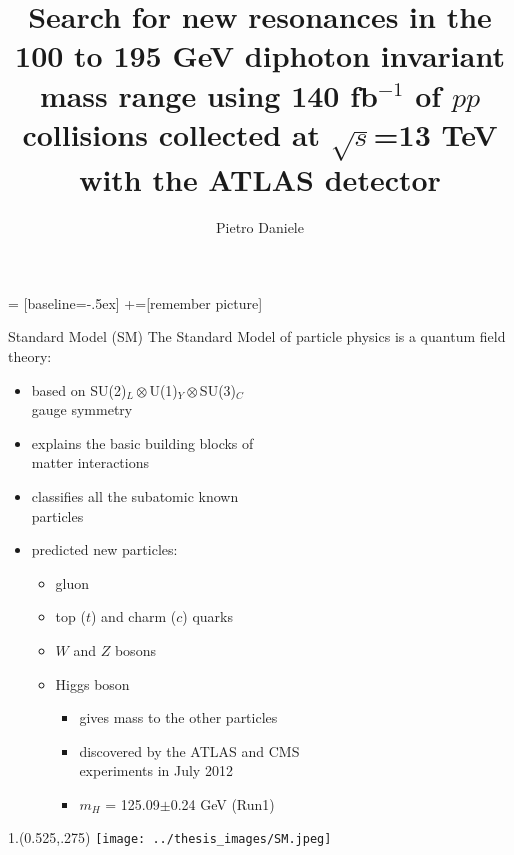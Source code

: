 \documentclass[10pt,UKenglish, leqno, xcolor = dvipsnames]{beamer}
\author{Pietro Daniele}
\title{\large Search for new resonances in the 100 to 195 GeV diphoton invariant mass range using 140 fb$^{-1}$ of $pp$ collisions collected at $\sqrt{s}$=13 TeV with the ATLAS detector}
\begin{document}
	 = [baseline=-.5ex]
	+=[remember picture]
	
	\begin{frame}{Standard Model (SM)}
		\vfill
		The Standard Model of particle physics is a quantum field theory:
		\begin{itemize}
			\item based on SU(2)$_L\otimes$U(1)$_Y\otimes$SU(3)$_C$\\ gauge symmetry
			\item explains the basic building blocks of\\ matter interactions
			\item classifies all the subatomic known\\ particles
			\item predicted new particles:
			\begin{itemize}
				\item gluon
				\item top ($t$) and charm ($c$) quarks
				\item $W$ and $Z$ bosons %
				\item Higgs boson
				\begin{itemize}
					\item gives mass to the other particles
					\item discovered by the ATLAS and CMS\\ experiments in July 2012 
					\item $m_H$ = 125.09$\pm$0.24 GeV (Run1)
				\end{itemize}
			\end{itemize}
		\end{itemize}
		
		\vfill
		\begin{textblock}{1.}(0.525,.275)
			\texttt{[image: ../thesis\_images/SM.jpeg]}
		\end{textblock}
	\end{frame}
\end{document}
